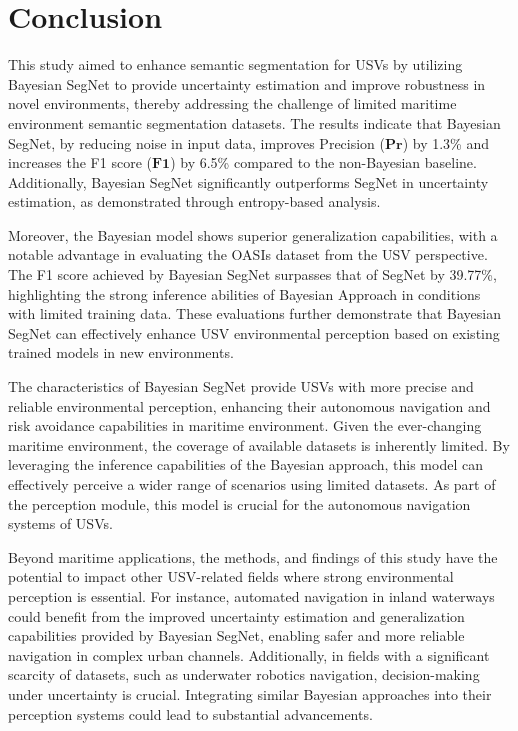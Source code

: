 \section{Conclusion}
\label{section:conclusion}
This study aimed to enhance semantic segmentation for USVs by utilizing Bayesian SegNet to provide uncertainty 
estimation and improve robustness in novel environments, thereby addressing the challenge of limited maritime 
environment semantic segmentation datasets. The results indicate that Bayesian SegNet, by reducing noise in input 
data, improves Precision ($\mathbf{Pr}$) by 1.3\% and increases the F1 score ($\mathbf{F1}$) by 6.5\% compared to the 
non-Bayesian baseline. Additionally, Bayesian SegNet significantly outperforms SegNet in uncertainty estimation, as 
demonstrated through entropy-based analysis. 

Moreover, the Bayesian model shows superior generalization capabilities, with a notable advantage in evaluating 
the OASIs dataset from the USV perspective. The F1 score achieved by Bayesian SegNet surpasses that of SegNet by 
39.77\%, highlighting the strong inference abilities of Bayesian Approach in conditions with limited training data. 
These evaluations further demonstrate that Bayesian SegNet can effectively enhance USV environmental perception 
based on existing trained models in new environments. 

The characteristics of Bayesian SegNet provide USVs with more precise and reliable environmental perception, 
enhancing their autonomous navigation and risk avoidance capabilities in maritime environment. Given the 
ever-changing maritime environment, the coverage of available datasets is inherently limited. By leveraging the 
inference capabilities of the Bayesian approach, this model can effectively perceive a wider range of scenarios 
using limited datasets. As part of the perception module, this model is crucial for the autonomous navigation 
systems of USVs.

Beyond maritime applications, the methods, and findings of this study have the potential to impact other USV-related 
fields where strong environmental perception is essential. For instance, automated navigation in inland waterways 
could benefit from the improved uncertainty estimation and generalization capabilities provided by Bayesian SegNet, 
enabling safer and more reliable navigation in complex urban channels. Additionally, in fields with a significant 
scarcity of datasets, such as underwater robotics navigation, decision-making under uncertainty is crucial. 
Integrating similar Bayesian approaches into their perception systems could lead to substantial advancements.

